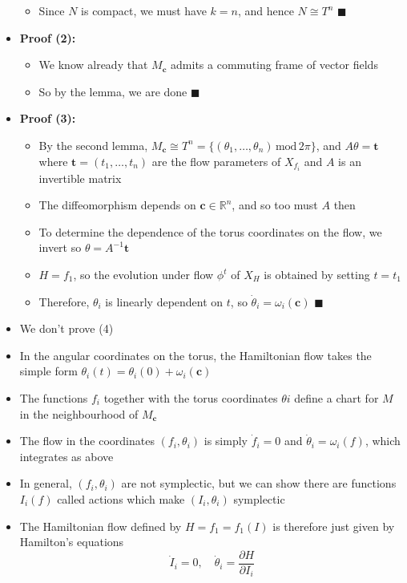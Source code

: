 \documentclass[12pt,a4paper]{article}
\numberwithin{equation}{section}
\begin{document}
\begin{itemize}
\begin{itemize}
			\item Since $N$ is compact, we must have $k=n$, and hence $N\cong T^{n}$ $\blacksquare$
		\end{itemize}
		\item \textbf{Proof (2):}
		\begin{itemize}
			\item We know already that $M_{\mathbf{c}}$ admits a commuting frame of vector fields
			\item So by the lemma, we are done $\blacksquare$
		\end{itemize}
		\item \textbf{Proof (3):}
		\begin{itemize}
			\item By the second lemma, $M_{\mathbf{c}}\cong T^{n}=\{(\theta_{1},\ldots,\theta_{n})\,\text{mod}\,2\pi\}$, and $A\theta =\mathbf{t}$ where $\mathbf{t}=(t_{1},\ldots,t_{n})$ are the flow parameters of $X_{f_{i}}$ and $A$ is an invertible matrix
			\item The diffeomorphism depends on $\mathbf{c}\in \mathbb{R}^{n}$, and so too must $A$ then
			\item To determine the dependence of the torus coordinates on the flow, we invert so $\theta=A^{-1}\mathbf{t}$
			\item $H=f_{1}$, so the evolution under flow $\phi^{t}$ of $X_{H}$ is obtained by setting $t=t_{1}$
			\item Therefore, $\theta_{i}$ is linearly dependent on $t$, so $\dot{\theta}_{i}=\omega_{i}(\mathbf{c})$ $\blacksquare$
		\end{itemize}
		\item We don't prove (4)
		\item In the angular coordinates on the torus, the Hamiltonian flow takes the simple form $\theta_{i}(t)=\theta_{i}(0)+\omega_{i}(\mathbf{c})$
		\item The functions $f_{i}$ together with the torus coordinates $\theta{i}$ define a chart for $M$ in the neighbourhood of $M_{\mathbf{c}}$
		\item The flow in the coordinates $(f_{i},\theta_{i})$ is simply $\dot{f}_{i}=0$ and $\dot{\theta}_{i}=\omega_{i}(f)$, which integrates as above
		\item In general, $(f_{i},\theta_{i})$ are not symplectic, but we can show there are functions $I_{i}(f)$ called actions which make $(I_{i},\theta_{i})$ symplectic
		\item The Hamiltonian flow defined by $H=f_{1}=f_{1}(I)$ is therefore just given by Hamilton's equations
		\begin{equation}
			\dot{I}_{i}=0,\quad\dot{\theta}_{i}=\frac{\partial H}{\partial I_{i}}
		\end{equation}
	\end{itemize}
	\newpage
\end{document}
